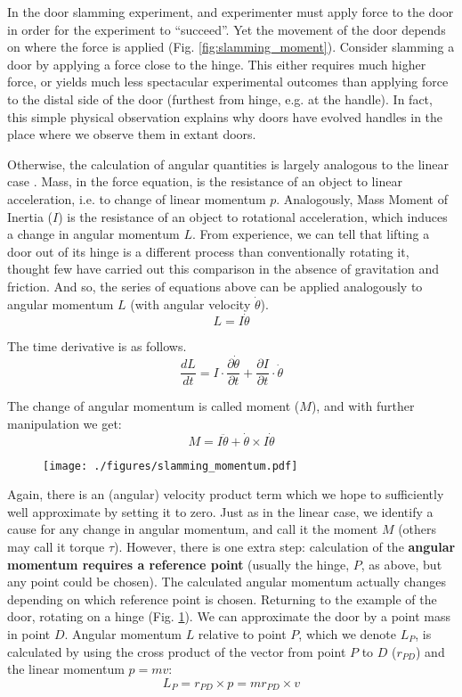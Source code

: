 In the door slamming experiment, and experimenter must apply force to the door in order for the experiment to ``succeed''.
Yet the movement of the door depends on where the force is applied (Fig. \ref{fig:slamming_moment}).
Consider slamming a door by applying a force close to the hinge.
This either requires much higher force, or yields much less spectacular experimental outcomes than applying force to the distal side of the door (furthest from hinge, e.g. at the handle).
In fact, this simple physical observation explains why doors have evolved handles in the place where we observe them in extant doors.


Otherwise, the calculation of angular quantities is largely analogous to the linear case \citep{Lewin801L20,Tipler2007}.
Mass, in the force equation, is the resistance of an object to linear acceleration, i.e. to change of linear momentum \(p\).
Analogously, Mass Moment of Inertia (\(I\)) is the resistance of an object to rotational acceleration, which induces a change in angular momentum \(L\).
From experience, we can tell that lifting a door out of its hinge is a different process than conventionally rotating it, thought few have carried out this comparison in the absence of gravitation and friction.
And so, the series of equations above can be applied analogously to angular momentum \(L\) (with angular velocity \(\dot \theta\)).
\[L = I \dot \theta\]

The time derivative is as follows.
\[\frac{dL}{dt} = I \cdot \frac{\partial \dot \theta}{\partial t} + \frac{\partial I}{\partial t} \cdot \dot \theta\]

The change of angular momentum is called moment (\(M\)), and with further manipulation \citep{Widnall2009} we get:
\begin{equation}\label{eqn:moment}
M = I \ddot\theta + \dot\theta \times I\dot\theta
\end{equation}


\begin{figure}[htbp]
\centering
\texttt{[image: ./figures/slamming\_momentum.pdf]}
\label{fig:slamming_momentum}
\end{figure}

Again, there is an (angular) velocity product term which we hope to sufficiently well approximate by setting it to zero.
Just as in the linear case, we identify a cause for any change in angular momentum, and call it the moment \(M\) (others may call it torque \(\tau\)).
However, there is one extra step: calculation of the \textbf{angular momentum requires a reference point} (usually the hinge, \(P\), as above, but any point could be chosen).
The calculated angular momentum actually changes depending on which reference point is chosen.
Returning to the example of the door, rotating on a hinge (Fig. \ref{fig:slamming_momentum}).
We can approximate the door by a point mass in point \(D\).
Angular momentum \(L\) relative to point \(P\), which we denote \(L_P\), is calculated by using the cross product of the vector from point \(P\) to \(D\) (\(r_{PD}\)) and the linear momentum \(p=mv\):
\[L_{P} = r_{PD} \times p = m r_{PD} \times v \]

